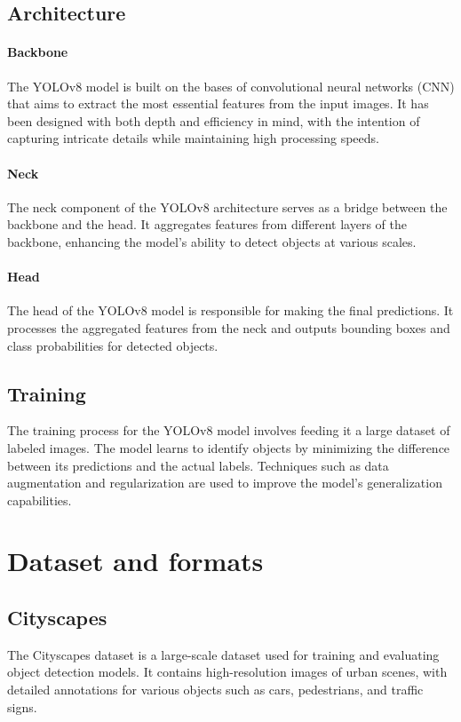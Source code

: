 \documentclass[11pt,a4paper,oneside]{report}
\begin{document}
\subsection{Architecture}\label{subsec:architecture}

\paragraph{Backbone}\label{par:backbone}
The YOLOv8 model is built on the bases of convolutional neural networks (CNN) that aims to extract the most essential features from the input images.
It has been designed with both depth and efficiency in mind, with the intention of capturing intricate details while maintaining high processing speeds.
\paragraph{Neck}\label{par:neck}
The neck component of the YOLOv8 architecture serves as a bridge between the backbone and the head.
It aggregates features from different layers of the backbone, enhancing the model's ability to detect objects at various scales.
\paragraph{Head}\label{par:head}
The head of the YOLOv8 model is responsible for making the final predictions.
It processes the aggregated features from the neck and outputs bounding boxes and class probabilities for detected objects.
\subsection{Training}\label{subsec:training}
The training process for the YOLOv8 model involves feeding it a large dataset of labeled images.
The model learns to identify objects by minimizing the difference between its predictions and the actual labels. Techniques such as data augmentation and regularization are used to improve the model's generalization capabilities.

\section{Dataset and formats}\label{sec:dataset-and-formats}

\subsection{Cityscapes}\label{subsec:cityscapes}
The Cityscapes dataset is a large-scale dataset used for training and evaluating object detection models.
It contains high-resolution images of urban scenes, with detailed annotations for various objects such as cars,
pedestrians, and traffic signs.
\end{document}
